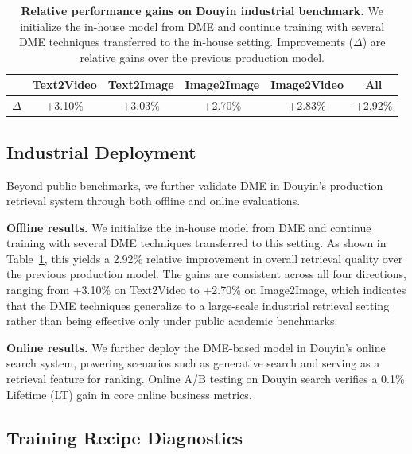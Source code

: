 \label{sec:douyin-industrial-benchmark}

\begin{table}[t]
\centering
\begin{tabular}{lccccc}
\toprule
 & Text2Video & Text2Image & Image2Image & Image2Video & All \\
\midrule
$\Delta$ & +3.10\% & +3.03\% & +2.70\% & +2.83\% & +2.92\% \\
\bottomrule
\end{tabular}
\caption{\textbf{Relative performance gains on Douyin industrial benchmark.} We initialize the in-house model from DME and continue
training with several DME techniques transferred to the in-house setting.
Improvements ($\Delta$) are relative gains over the previous production model.}
\label{tab:inhouse-transfer}
\end{table}

\subsection{Industrial Deployment}
\label{sec:industrial-deployment}

Beyond public benchmarks, we further validate DME in Douyin's production retrieval system through both offline and online evaluations.

\textbf{Offline results.}
We initialize the in-house model from DME and continue training with several DME techniques transferred to this setting. As shown in Table~\ref{tab:inhouse-transfer}, this yields a 2.92\% relative improvement in overall retrieval quality over the previous production model. The gains are consistent across all four directions, ranging from +3.10\% on Text2Video to +2.70\% on Image2Image, which indicates that the DME techniques generalize to a large-scale industrial retrieval setting rather than being effective only under public academic benchmarks.

\textbf{Online results.}
We further deploy the DME-based model in Douyin's online search system, powering scenarios such as generative search and serving as a retrieval feature for ranking. Online A/B testing on Douyin search verifies a 0.1\% Lifetime (LT) gain in core online business metrics.


\subsection{Training Recipe Diagnostics}
\label{sec:training-recipe-diagnostics}

